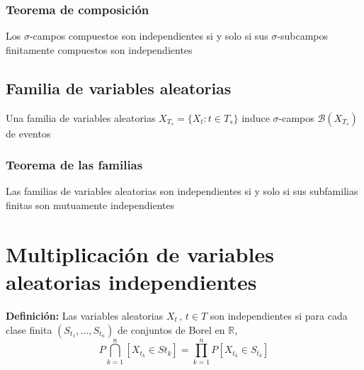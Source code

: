 \documentclass[12pt,a4paper]{book}
\begin{document}
\subsubsection{Teorema de composición}
\begin{theorem}
Los $\sigma$-campos compuestos son independientes si y solo si sus $\sigma$-subcampos finitamente compuestos son independientes
\end{theorem}
\subsection{Familia de variables aleatorias}
Una familia de variables aleatorias $X_{T_s}=\{ X_t : t\in T_s \}$ induce $\sigma$-campos $\mathcal{B}(X_{T_s})$ de eventos
\subsubsection{Teorema de las familias}
\begin{theorem}
Las familias de variables aleatorias son independientes si y solo si sus subfamilias finitas son mutuamente independientes
\end{theorem}
\section{Multiplicación de variables aleatorias independientes}
\textbf{Definición: } Las variables aleatorias $X_t\, , \, t\in T$ son independientes si para cada clase finita $(S_{t_1},\ldots , S_{t_n})$ de conjuntos de Borel en $\mathbb{R}$,
$$P\bigcap_{k=1}^{n}[X_{t_k}\in S{t_k}]=\displaystyle\prod_{k=1}^n P[X_{t_k}\in S_{t_k}]$$
\end{document}
